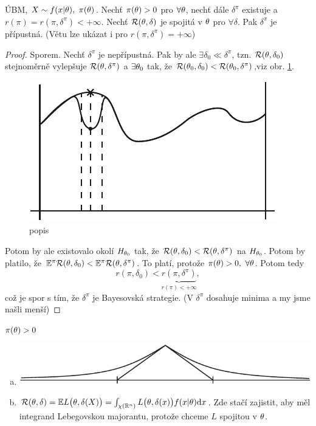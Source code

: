 \begin{theorem}
	ÚBM, $X\sim f(x|\theta),~\pi(\theta)$. Nechť $\pi(\theta)>0$ pro $\forall\theta$, nechť dále $\delta^{\pi}$ existuje a $r(\pi)=r(\pi,\delta^{\pi})<+\infty$. Nechť $\mathcal{R}(\theta,\delta)$ je spojitá v $\theta$ pro $\forall \delta$. Pak $\delta^\pi$ je přípustná. (Větu lze ukázat i pro $r(\pi,\delta^{\pi})=+\infty$)
	\begin{proof}
		Sporem. Nechť $\delta^\pi$ je nepřípustná. Pak by ale $\exists\delta_0\ll\delta^\pi$, tzn. $\mathcal{R}(\theta,\delta_0)$ stejnoměrně vylepšuje $\mathcal{R}(\theta,\delta^\pi)$ a $\exists\theta_0$ tak, že $\mathcal{R}(\theta_0,\delta_0)<\mathcal{R}(\theta_0,\delta^\pi)$,viz obr. \ref{fig:26}.
		\begin{figure}[h]
			\centering
			\includegraphics[width=0.35\linewidth]{pictures/26_11.pdf}
			\caption{popis}
			\label{fig:26}
		\end{figure}
		Potom by ale existovalo okolí $H_{\theta_0}$ tak, že $\mathcal{R}(\theta,\delta_0)<\mathcal{R}(\theta,\delta^\pi)$ na $H_{\theta_0}$. Potom by platilo, že $\mathbb{E}^{\pi} \mathcal{R}(\theta,\delta_0)<\mathbb{E}^\pi \mathcal{R}(\theta,\delta^\pi)$. To platí, protože $\pi(\theta)>0,~\forall\theta$. Potom tedy 
		$$ r(\pi,\delta_0)<\underbrace{r(\pi,\delta^\pi)}_{r(\pi)<+\infty},$$ což je spor s tím, že $\delta^{\pi}$ je Bayesovská strategie. (V $\delta^{\pi}$ dosahuje minima a my jsme našli menší)
	\end{proof} 
\end{theorem}
\begin{remark}
	$\pi(\theta)>0$
\begin{enumerate}[a)]
	\item 	\begin{center}
			\includegraphics[width=0.7\linewidth]{pictures/26_11_2.pdf}
	\end{center}
\item $\mathcal{R}(\theta,\delta)=\mathbb{E} L\big(\theta,\delta(X)\big)=\int_{\chi(\mathbb{R}^n)}L\big(\theta,\delta(x)\big)f(x|\theta)\mathrm{d} x$. Zde stačí zajistit, aby měl integrand Lebegovskou majorantu, protože chceme $L$ spojitou v $\theta$.
\end{enumerate}

\end{remark}
